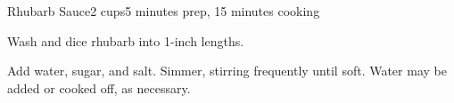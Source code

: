 \documentclass[../Cookbook.tex]{subfiles}
\begin{document}
\begin{recipe}{Rhubarb Sauce}{2 cups}{5 minutes prep, 15 minutes cooking}

Wash and dice rhubarb into 1-inch lengths.

Add water, sugar, and salt. Simmer, stirring frequently until soft. Water may be added or cooked off, as necessary.

\end{recipe}
\end{document}

